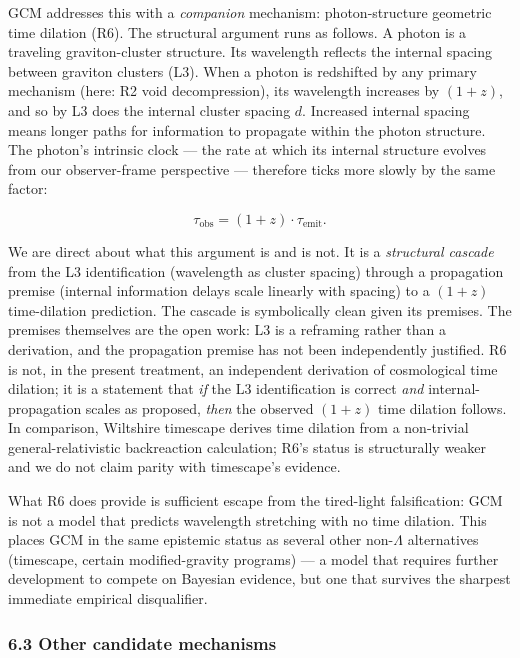 \documentclass[12pt]{article}
\theoremstyle{definition}
\theoremstyle{remark}
\begin{document}
GCM addresses this with a \emph{companion} mechanism: photon-structure
geometric time dilation (R6). The structural argument runs as follows. A
photon is a traveling graviton-cluster structure. Its wavelength
reflects the internal spacing between graviton clusters (L3). When a
photon is redshifted by any primary mechanism (here: R2 void
decompression), its wavelength increases by \((1+z)\), and so by L3 does
the internal cluster spacing \(d\). Increased internal spacing means
longer paths for information to propagate within the photon structure.
The photon's intrinsic clock --- the rate at which its internal
structure evolves from our observer-frame perspective --- therefore
ticks more slowly by the same factor:

\[\tau_{\text{obs}} = (1+z) \cdot \tau_{\text{emit}}.\]

We are direct about what this argument is and is not. It is a
\emph{structural cascade} from the L3 identification (wavelength as
cluster spacing) through a propagation premise (internal information
delays scale linearly with spacing) to a \((1+z)\) time-dilation
prediction. The cascade is symbolically clean given its premises. The
premises themselves are the open work: L3 is a reframing rather than a
derivation, and the propagation premise has not been independently
justified. R6 is not, in the present treatment, an independent
derivation of cosmological time dilation; it is a statement that
\emph{if} the L3 identification is correct \emph{and}
internal-propagation scales as proposed, \emph{then} the observed
\((1+z)\) time dilation follows. In comparison, Wiltshire timescape
derives time dilation from a non-trivial general-relativistic
backreaction calculation; R6's status is structurally weaker and we do
not claim parity with timescape's evidence.

What R6 does provide is sufficient escape from the tired-light
falsification: GCM is not a model that predicts wavelength stretching
with no time dilation. This places GCM in the same epistemic status as
several other non-\(\Lambda\) alternatives (timescape, certain
modified-gravity programs) --- a model that requires further development
to compete on Bayesian evidence, but one that survives the sharpest
immediate empirical disqualifier.

\subsubsection{6.3 Other candidate
mechanisms}\label{other-candidate-mechanisms}
\end{document}
